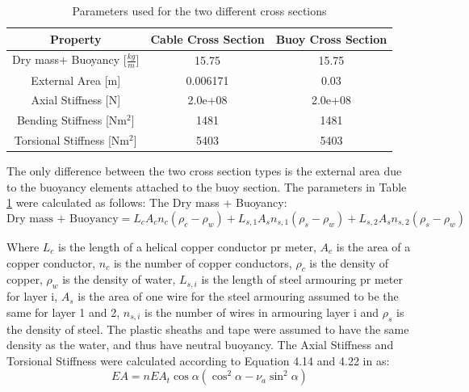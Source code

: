 \begin{table} [H]
\centering
\begin{tabular}{ |c|c|c|}
\hline
Property& Cable Cross Section & Buoy Cross Section \\
 \hline
 \hline
Dry mass+ Buoyancy [$\frac{kg}{m}$] & 15.75 & 15.75\\
External Area [m]& 0.006171 & 0.03\\
Axial Stiffness [N] & 2.0e+08 & 2.0e+08\\
Bending Stiffness [Nm$^2$] & 1481 & 1481\\
Torsional Stiffness [Nm$^2$] & 5403 & 5403\\
 \hline
\end{tabular}
\caption{Parameters used for the two different cross sections}
\label{table:crosssima}
\end{table}
\noindent The only difference between the two cross section types is the external area due to the buoyancy elements attached to the buoy section. The parameters in Table \ref{table:crosssima} were calculated as follows:\newline
\newline 
\noindent The Dry mass + Buoyancy: 
\begin{equation}
\text{Dry mass + Buoyancy}=L_{c} A_cn_c (\rho_c-\rho_w) + L_{s,1} A_{s}n_{s,1} (\rho_s-\rho_w)+L_{s,2} A_{s}n_{s,2} (\rho_s-\rho_w)
\end{equation}

\noindent Where $L_c$ is the length of a helical copper conductor pr meter, $A_c$ is the area of a copper conductor, $n_c$ is the number of copper conductors, $\rho_c$ is the density of copper, $\rho_w$ is the density of water, $L_{s,i}$ is the length of steel armouring pr meter for layer i, $A_s$ is the area of one wire for the steel armouring assumed to be the same for layer 1 and 2, $n_{s,i}$ is the number of wires in armouring layer i and $\rho_s$ is the density of steel. The plastic sheaths and tape were assumed to have the same density as the water, and thus have neutral buoyancy. \newline
\newline 
The Axial Stiffness and Torsional Stiffness were calculated according to Equation 4.14 and 4.22 in \cite{Savik2016} as:
\begin{equation}
    EA=nEA_t \cos\alpha(\cos^2\alpha-\nu_a \sin^2\alpha)
\end{equation}


